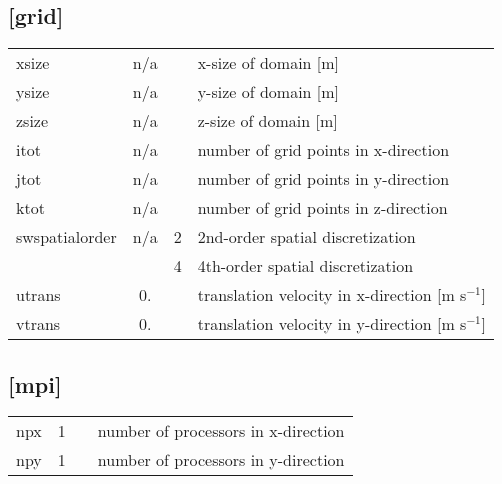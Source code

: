 \documentclass[a4paper,10pt]{extarticle}
\begin{document}
\subsection*{[grid]}
\tablelasttail{\hline}
\begin{supertabular}{lccl}
xsize          & n/a   &   & x-size of domain [m]\\
ysize          & n/a   &   & y-size of domain [m]\\
zsize          & n/a   &   & z-size of domain [m]\\
itot           & n/a   &   & number of grid points in x-direction \\
jtot           & n/a   &   & number of grid points in y-direction \\
ktot           & n/a   &   & number of grid points in z-direction \\
swspatialorder & n/a   & 2 & 2nd-order spatial discretization \\
               &       & 4 & 4th-order spatial discretization \\
utrans         & 0.    &   & translation velocity in x-direction [m s$^{-1}$] \\
vtrans         & 0.    &   & translation velocity in y-direction [m s$^{-1}$] \\
\end{supertabular}
\subsection*{[mpi]}
\tablelasttail{\hline}
\begin{supertabular}{lccl}
npx           & 1     & & number of processors in x-direction \\
npy           & 1     & & number of processors in y-direction \\
\end{supertabular}
\end{document}
